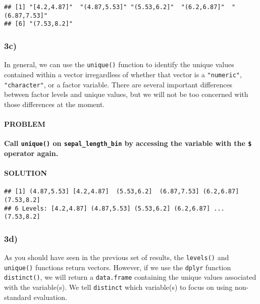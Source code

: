\documentclass[]{article}
\newenvironment{Shaded}{\begin{snugshade}}{\end{snugshade}}
\newcommand{\KeywordTok}[1]{\textcolor[rgb]{0.13,0.29,0.53}{\textbf{#1}}}
\newcommand{\NormalTok}[1]{#1}
\newcommand{\OperatorTok}[1]{\textcolor[rgb]{0.81,0.36,0.00}{\textbf{#1}}}
\let\oldparagraph\paragraph
\renewcommand{\paragraph}[1]{\oldparagraph{#1}\mbox{}}
\begin{document}
\begin{verbatim}
## [1] "[4.2,4.87]"  "(4.87,5.53]" "(5.53,6.2]"  "(6.2,6.87]"  "(6.87,7.53]"
## [6] "(7.53,8.2]"
\end{verbatim}

\hypertarget{c-2}{%
\subsubsection{3c)}\label{c-2}}

In general, we can use the \texttt{unique()} function to identify the
unique values contained within a vector irregardless of whether that
vector is a \texttt{"numeric"}, \texttt{"character"}, or a factor
variable. There are several important differences between factor levels
and unique values, but we will not be too concerned with those
differences at the moment.

\hypertarget{problem-13}{%
\paragraph{PROBLEM}\label{problem-13}}

\textbf{Call \texttt{unique()} on \texttt{sepal\_length\_bin} by
accessing the variable with the \texttt{\$} operator again.}

\hypertarget{solution-12}{%
\paragraph{SOLUTION}\label{solution-12}}

\begin{Shaded}
\end{Shaded}

\begin{verbatim}
## [1] (4.87,5.53] [4.2,4.87]  (5.53,6.2]  (6.87,7.53] (6.2,6.87]  (7.53,8.2] 
## 6 Levels: [4.2,4.87] (4.87,5.53] (5.53,6.2] (6.2,6.87] ... (7.53,8.2]
\end{verbatim}

\hypertarget{d-2}{%
\subsubsection{3d)}\label{d-2}}

As you should have seen in the previous set of results, the
\texttt{levels()} and \texttt{unique()} functions return vectors.
However, if we use the \texttt{dplyr} function \texttt{distinct()}, we
will return a \texttt{data.frame} containing the unique values
associated with the variable(s). We tell \texttt{distinct} which
variable(s) to focus on using non-standard evaluation.
\end{document}
